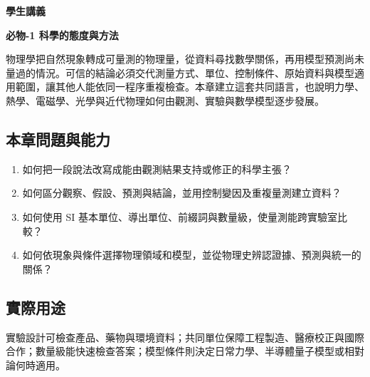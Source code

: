 \documentclass[11pt,a4paper]{article}
\providecommand{\tightlist}{%
  \setlength{\itemsep}{0pt}\setlength{\parskip}{0pt}}
\begin{document}
\begin{tcolorbox}[
  enhanced,colback=white,colframe=HandoutBlue,boxrule=1.1pt,arc=2mm,
  borderline west={3pt}{0pt}{HandoutBlue},left=5mm,right=4mm,top=4mm,bottom=4mm
]
{\sffamily\small\bfseries\color{HandoutBlue}學生講義}\par
{\sffamily\bfseries\LARGE\color{HandoutInk}必物-1 科學的態度與方法}\par
\vspace{0.35em}{\large 從可檢驗主張、量測資料與共同單位，建立能預測且可重複檢查的物理模型}\par
{}\par
{}\par
\end{tcolorbox}


物理學把自然現象轉成可量測的物理量，從資料尋找數學關係，再用模型預測尚未量過的情況。可信的結論必須交代測量方式、單位、控制條件、原始資料與模型適用範圍，讓其他人能依同一程序重複檢查。本章建立這套共同語言，也說明力學、熱學、電磁學、光學與近代物理如何由觀測、實驗與數學模型逐步發展。

\begin{HandoutLearningMap}

\subsection{本章問題與能力}\label{ux672cux7ae0ux554fux984cux8207ux80fdux529b}

\begin{enumerate}
\def\labelenumi{\arabic{enumi}.}
\tightlist
\item
  如何把一段說法改寫成能由觀測結果支持或修正的科學主張？
\item
  如何區分觀察、假設、預測與結論，並用控制變因及重複量測建立資料？
\item
  如何使用 SI 基本單位、導出單位、前綴詞與數量級，使量測能跨實驗室比較？
\item
  如何依現象與條件選擇物理領域和模型，並從物理史辨認證據、預測與統一的關係？
\end{enumerate}

\subsection{實際用途}\label{ux5be6ux969bux7528ux9014}

實驗設計可檢查產品、藥物與環境資料；共同單位保障工程製造、醫療校正與國際合作；數量級能快速檢查答案；模型條件則決定日常力學、半導體量子模型或相對論何時適用。

\end{HandoutLearningMap}
\end{document}
